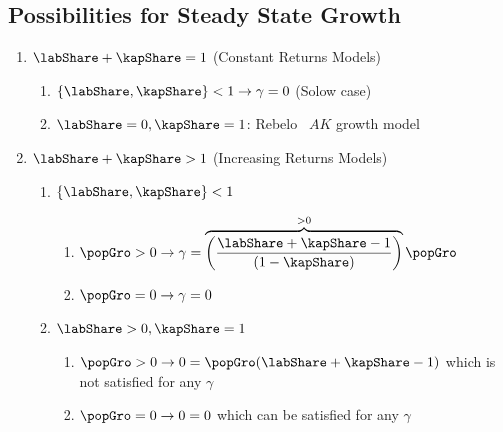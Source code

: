 \documentclass{handout}
\begin{document}
\pagebreak
\subsection{Possibilities for Steady State Growth}

\begin{enumerate}
\item $\labShare+\kapShare = 1$  (Constant Returns Models)

  \begin{enumerate}
    \item $\{\labShare, \kapShare\} < 1 \rightarrow \gamma = 0$  (Solow case)


    \item $\labShare = 0, \kapShare = 1$: Rebelo~\cite{rebelo:long} $AK$ growth model
  \end{enumerate}

\item $\labShare+\kapShare > 1$  (Increasing Returns Models)

\begin{enumerate}

\item $\{\labShare, \kapShare\} < 1$

\begin{enumerate}
\item $\popGro > 0 \rightarrow \gamma = \overbrace{\left(\frac{\labShare+\kapShare-1}{(1-\kapShare)}\right)}^{>0} \popGro$ 


\item $\popGro = 0 \rightarrow \gamma = 0$

\end{enumerate}

\item $\labShare>0, \kapShare = 1$

\begin{enumerate}

  
\item $\popGro>0 \rightarrow 0 = \popGro(\labShare+\kapShare-1)$ which is not satisfied
  for any $\gamma$ 


\item $\popGro=0 \rightarrow 0 = 0$ which can be satisfied for any $\gamma$

\end{enumerate}

\end{enumerate}

\end{enumerate}
\end{document}
